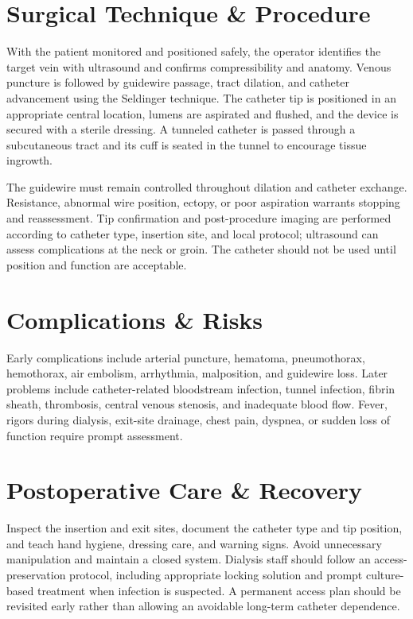 \section*{Surgical Technique \& Procedure}
With the patient monitored and positioned safely, the operator identifies the target vein with ultrasound and confirms compressibility and anatomy. Venous puncture is followed by guidewire passage, tract dilation, and catheter advancement using the Seldinger technique. The catheter tip is positioned in an appropriate central location, lumens are aspirated and flushed, and the device is secured with a sterile dressing. A tunneled catheter is passed through a subcutaneous tract and its cuff is seated in the tunnel to encourage tissue ingrowth.

The guidewire must remain controlled throughout dilation and catheter exchange. Resistance, abnormal wire position, ectopy, or poor aspiration warrants stopping and reassessment. Tip confirmation and post-procedure imaging are performed according to catheter type, insertion site, and local protocol; ultrasound can assess complications at the neck or groin. The catheter should not be used until position and function are acceptable.

\section*{Complications \& Risks}
Early complications include arterial puncture, hematoma, pneumothorax, hemothorax, air embolism, arrhythmia, malposition, and guidewire loss. Later problems include catheter-related bloodstream infection, tunnel infection, fibrin sheath, thrombosis, central venous stenosis, and inadequate blood flow. Fever, rigors during dialysis, exit-site drainage, chest pain, dyspnea, or sudden loss of function require prompt assessment.

\section*{Postoperative Care \& Recovery}
Inspect the insertion and exit sites, document the catheter type and tip position, and teach hand hygiene, dressing care, and warning signs. Avoid unnecessary manipulation and maintain a closed system. Dialysis staff should follow an access-preservation protocol, including appropriate locking solution and prompt culture-based treatment when infection is suspected. A permanent access plan should be revisited early rather than allowing an avoidable long-term catheter dependence.

